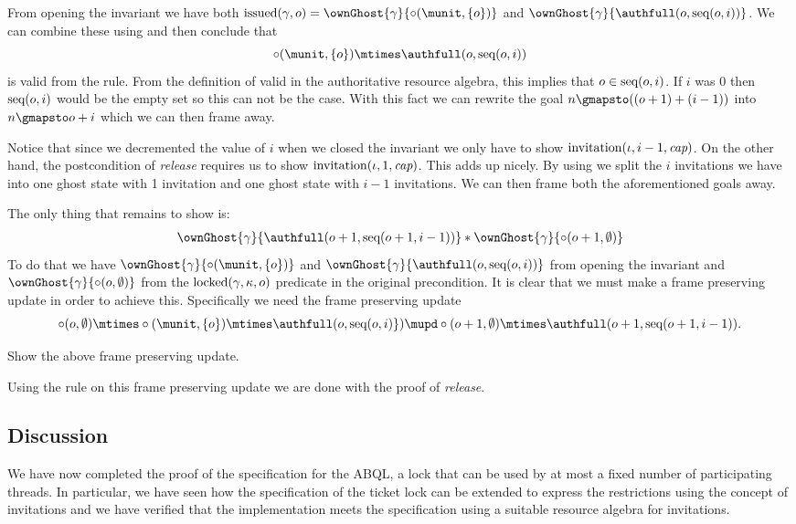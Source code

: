 From opening the invariant we have both
$\issuedA = \ownGhost{\gamma}{\circ(\munit, \{o\})}$ and
$\ownGhost{\gamma}{\authfull ( o, \seq(o, i))}$. We can combine these using
 and then conclude that
\[ \circ(\munit, \{o\}) \mtimes \authfull(o, \seq(o,i)) \] is valid from the
 rule. From the definition of valid in the authoritative
resource algebra, this implies that $o \in \text{seq}(o, i)$. If $i$ was 0 then
$\text{seq}(o, i)$ would be the empty set so this can not be the case. With this fact
we can rewrite the goal $n \gmapsto ((o + 1) + (i - 1))$ into $n \gmapsto o + i$
which we can then frame away.

Notice that since we decremented the value of $i$ when we closed the invariant
we only have to show $\operatorname{invitation}(\iota, i - 1, \textit{cap})$. On the other hand, the
postcondition of \textit{release} requires us to show
$\operatorname{invitation}(\iota, 1, \textit{cap})$. This adds up nicely. By using  we
split the $i$ invitations we have into one ghost state with 1 invitation and one
ghost state with $i - 1$ invitations. We can then frame both the aforementioned
goals away.

The only thing that remains to show is:
\begin{align*}
  \ownGhost{\gamma}{\authfull ( o + 1, \seq(o + 1, i - 1))} \ast \ownGhost{\gamma}{\circ (o + 1, \emptyset)}
\end{align*}
To do that we have $\ownGhost{\gamma}{\circ(\munit, \{o\})}$ and $\ownGhost{\gamma}{\authfull ( o, \seq(o, i))}$ from opening the invariant and $\ownGhost{\gamma}{\circ(o, \emptyset)}$ from the $\text{locked}(\gamma, \kappa, o)$ predicate in the original precondition.
It is clear that we must make a frame preserving update in order to achieve this.
Specifically we need the frame preserving update
\[
    \circ (o, \emptyset) \mtimes \circ (\munit, \{ o \}) \mtimes \authfull (o, \seq(o, i) \})
    \mupd
    \circ (o + 1, \emptyset) \mtimes \authfull (o + 1, \seq(o + 1, i - 1 ))
    .
\]
\begin{exercise}
  Show the above frame preserving update.
\end{exercise}


Using the  rule on this frame preserving update
we are done with the proof of \textit{release}.

\subsection{Discussion}

We have now completed the proof of the specification for the ABQL, a lock that can be used
by at most a fixed number of participating threads.
In particular, we have seen how the specification of the ticket lock can be
extended to express the restrictions using the concept of invitations and we have
verified that the implementation meets the specification using a suitable resource
algebra for invitations.

